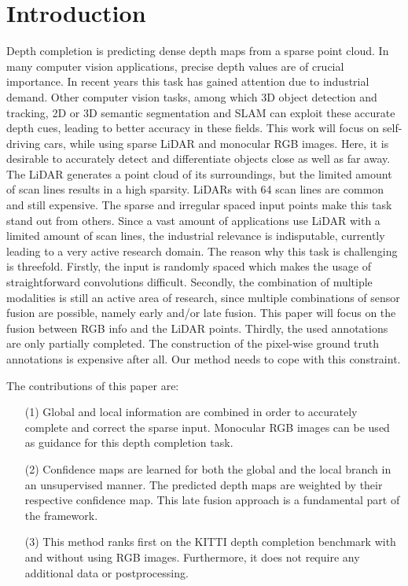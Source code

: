 \documentclass{main_style}
\begin{document}
\section{Introduction}
 Depth completion is predicting dense depth maps from a sparse point cloud. In many computer vision applications, precise depth values are of crucial importance. In recent years this task has gained attention due to industrial demand. Other computer vision tasks, among which 3D object detection and tracking, 2D or 3D semantic segmentation and SLAM can exploit these accurate depth cues, leading to better accuracy in these fields.  
 This work will focus on self-driving cars, while using sparse LiDAR and monocular RGB images. Here, it is desirable to accurately detect and differentiate objects close as well as far away. The LiDAR generates a point cloud of its surroundings, but the limited amount of scan lines results in a high sparsity. LiDARs with 64 scan lines are common and still expensive. The sparse and irregular spaced input points make this task stand out from others. Since a vast amount of applications use LiDAR with a limited amount of scan lines, the industrial relevance is indisputable, currently leading to a very active research domain.
 The reason why this task is challenging is threefold. Firstly, the input is randomly spaced which makes the usage of straightforward convolutions difficult. Secondly, the combination of multiple modalities is still an active area of research, since multiple combinations of sensor fusion are possible, namely early and/or late fusion. This paper will focus on the fusion between RGB info and the LiDAR points. Thirdly, the used annotations are only partially completed. The construction of the pixel-wise ground truth annotations is expensive after all. Our method needs to cope with this constraint. 
 
 The contributions of this paper are:
\begin{itemize}
  \item[(1)] Global and local information are combined in order to accurately complete and correct the sparse input. Monocular RGB images can be used as guidance for this depth completion task. 
  \item[(2)] Confidence maps are learned for both the global and the local branch in an unsupervised manner. The predicted depth maps are weighted by their respective confidence map. This late fusion approach is a fundamental part of the framework.
   \item[(3)] This method ranks first on the KITTI depth completion benchmark with and without using RGB images. Furthermore, it does not require any additional data or postprocessing.
\end{itemize}
\end{document}
